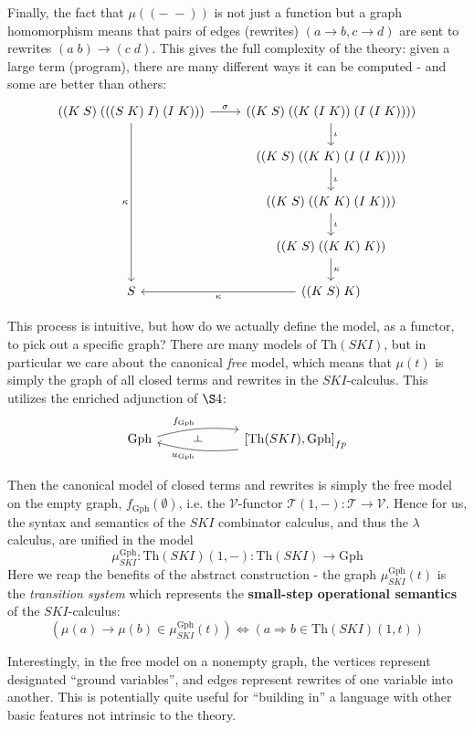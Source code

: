 \documentclass[a4paper,UKenglish]{article}
\theoremstyle{definition}
\def\ld{\rotatebox[origin=c]{-90}{$\dashv$}} %
\newcommand{\Th}{\mathrm{Th}}
\newcommand{\Gph}{\mathrm{Gph}}
\newcommand{\V}{\mathscr{V}}
\newcommand{\T}{\mathscr{T}}
\begin{document}
Finally, the fact that $\mu((-\;-))$ is not just a function but a graph homomorphism means that pairs of edges (rewrites) $(a\to b, c\to d)$ are sent to rewrites $(a\; b) \to (c\; d)$. This gives the full complexity of the theory: given a large term (program), there are many different ways it can be computed - and some are better than others:
\[\begin{tikzcd}
	((K\; S)\; (((S\; K)\; I)\; (I\; K))) \arrow[r,"\sigma"] \arrow[dddd,swap,"\kappa"] & ((K\; S)\; ((K\;(I\; K))\; (I\; (I\; K)))) \arrow[d,"\iota"]\\
	& ((K\; S)\; ((K\; K)\; (I\; (I\; K)))) \arrow[d,"\iota"]\\
	& ((K\; S)\; ((K\; K)\; (I\; K))) \arrow[d,"\iota"]\\
	& ((K\; S)\; ((K\; K)\; K)) \arrow[d,"\kappa"]\\
	S & ((K\; S)\; K)\arrow[l,"\kappa"]
\end{tikzcd}\]

This process is intuitive, but how do we actually define the model, as a functor, to pick out a specific graph? There are many models of $\Th(SKI)$, but in particular we care about the canonical \textit{free} model, which means that $\mu(t)$ is simply the graph of all closed terms and rewrites in the $SKI$-calculus. This utilizes the enriched adjunction of $\S4$:
\[\begin{tikzcd}
\Gph \arrow[bend left=10,"f_\Gph"]{rr}
& \ld &
\arrow[bend left=10,"u_\Gph"]{ll} \left[\Th(SKI),\Gph\right]_{fp}
\end{tikzcd}\]

Then the canonical model of closed terms and rewrites is simply the free model on the empty graph, $f_\Gph(\emptyset)$, i.e. the $\V$-functor $\T(1,-):\T\to \V$. Hence for us, the syntax and semantics of the $SKI$ combinator calculus, and thus the $\lambda$ calculus, are unified in the model $$\mu_{SKI}^\Gph: \Th(SKI)(1,-): \Th(SKI) \to \Gph$$
Here we reap the benefits of the abstract construction - the graph $\mu_{SKI}^\Gph(t)$ is the \textit{transition system} which represents the \textbf{small-step operational semantics} of the $SKI$-calculus: $$(\mu(a) \to \mu(b) \in \mu_{SKI}^\Gph(t)) \iff (a \Rightarrow b \in \Th(SKI)(1,t))$$

Interestingly, in the free model on a nonempty graph, the vertices represent designated ``ground variables'', and edges represent rewrites of one variable into another. This is potentially quite useful for ``building in'' a language with other basic features not intrinsic to the theory.
\end{document}
